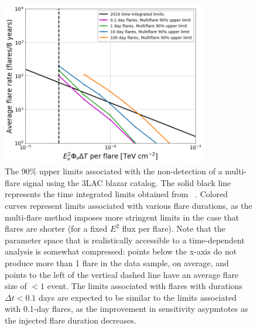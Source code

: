 \begin{figure}[h]
\centering
\includegraphics[width=0.8\textwidth]{figs/3lac_lims.png}
\caption{The 90\% upper limits associated with the non-detection of a multi-flare signal using the 3LAC blazar catalog. The solid black line represents the time integrated limits obtained from ~\cite{2lac_ic}. Colored curves represent limits associated with various flare durations, as the multi-flare method imposes more stringent limits in the case that flares are shorter (for a fixed $E^2$ flux per flare). Note that the parameter space that is realistically accessible to a time-dependent analysis is somewhat compressed: points below the x-axis do not produce more than 1 flare in the data sample, on average, and points to the left of the vertical dashed line have an average flare size of $< 1$ event. The limits associated with flares with durations $\Delta t < 0.1$ days are expected to be similar to the limits associated with 0.1-day flares, as the improvement in sensitivity asypmtotes as the injected flare duration decreases.}
\label{fig:3laclimits}
\end{figure}


